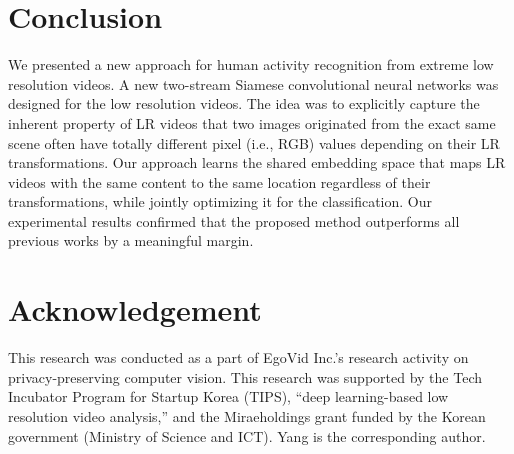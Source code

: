 \documentclass[letterpaper]{article} %
\begin{document}
\section{Conclusion}

We presented a new approach for human activity recognition from extreme low resolution videos. A new two-stream Siamese convolutional neural networks was designed for the low resolution videos. The idea was to explicitly capture the inherent property of LR videos that two images originated from the exact same scene often have totally different pixel (i.e., RGB) values depending on their LR transformations. Our approach learns the shared embedding space that maps LR videos with the same content to the same location regardless of their transformations, while jointly optimizing it for the classification. Our experimental results confirmed that the proposed method outperforms all previous works by a meaningful margin.

\section*{Acknowledgement}

This research was conducted as a part of EgoVid Inc.'s research activity on privacy-preserving computer vision. This research was supported by the Tech Incubator Program for Startup Korea (TIPS), ``deep learning-based low resolution video analysis,'' and the Miraeholdings grant funded by the Korean government (Ministry of Science and ICT). Yang is the corresponding author. 




\end{document}
